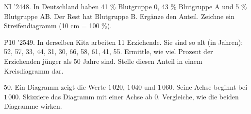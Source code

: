 \documentclass[11pt]{article}
\begin{document}
\pfgruppe{}
\begin{pfaufg}{NI ’24}{48.}{}
In Deutschland haben 41 \% Blutgruppe 0, 43 \% Blutgruppe A und 5 \% Blutgruppe AB. Der Rest hat Blutgruppe B. Ergänze den Anteil. Zeichne ein Streifendiagramm (10 cm = 100 \%).
\par\smallskip\noindent {}
\par\smallskip\noindent {}\par
{}
\end{pfaufg}
\pfgruppe{}
\begin{pfaufg}{P10 ’25}{49.}{}
In derselben Kita arbeiten 11 Erziehende. Sie sind so alt (in Jahren): 52, 57, 33, 44, 31, 30, 66, 58, 61, 41, 55. Ermittle, wie viel Prozent der Erziehenden jünger als 50 Jahre sind. Stelle diesen Anteil in einem Kreisdiagramm dar.
\par\smallskip\noindent \kreisleer[2.5]\par
{}
\end{pfaufg}
\pfgruppe{}
\begin{pfaufg}{}{50.}{}
Ein Diagramm zeigt die Werte $1\,020$, $1\,040$ und $1\,060$. Seine Achse beginnt bei $1\,000$. Skizziere das Diagramm mit einer Achse ab $0$. Vergleiche, wie die beiden Diagramme wirken.
\par\smallskip\noindent {}\par
{}
\end{pfaufg}
\pfgruppe{}
\end{document}

